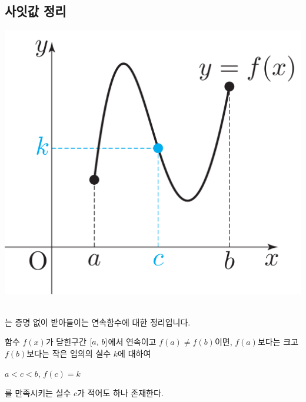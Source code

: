 \subsection{사잇값 정리}
\begin{center} \includegraphics[scale=\pgfkeysvalueof{picsize}]{DBs/pic/zerg_06.pdf}\
	\end{center}는 증명 없이 받아들이는 연속함수에 대한 정리입니다.
\begin{thmbox}
    함수 $f\left( x \right) $가 닫힌구간 $\left[a,\: b\right]$에서 연속이고 $f\left( a \right) \ne f\left( b \right) $이면, $f\left( a \right) $보다는 크고 $f\left( b \right) $보다는 작은 임의의 실수 $k$에 대하여
    \begin{center}
        $a<c<b$, $f\left( c \right) =k$
    \end{center}    를 만족시키는 실수 $c$가 적어도 하나 존재한다.
\end{thmbox}
